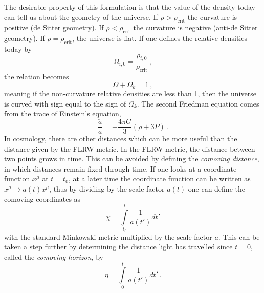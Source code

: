 The desirable property of this formulation is that the value of the density today can tell us about the geometry of the universe. If $\rho>\rho_{\mathrm{crit}}$ the curvature is positive (de Sitter geometry). If $\rho<\rho_{\mathrm{crit}}$ the curvature is negative (anti-de Sitter geometry). If $\rho=\rho_{\mathrm{crit}}$, the universe is flat. If one defines the relative densities today by
\begin{equation}
    \Omega_{i,0} = \frac{\rho_{i,0}}{\rho_\mathrm{crit}}\,,
\end{equation}
the relation becomes
\begin{equation}
    \Omega + \Omega_k = 1 \,,
\end{equation}
meaning if the non-curvature relative densities are less than 1, then the universe is curved with sign equal to the sign of $\Omega_k$. 
The second Friedman equation comes from the trace of Einstein's equation,
\begin{equation}
    \frac{\ddot a}{a} = -\frac{4\pi G}{3}(\rho + 3P)\,.
\end{equation}
In cosmology, there are other distances which can be more useful than the distance given by the FLRW metric. In the FLRW metric, the distance between two points grows in time. 
This can be avoided by defining the \textit{comoving distance}, in which distances remain fixed through time. 
If one looks at a coordinate function $x^\mu$ at $t=t_0$, at a later time the coordinate function can be written as $x^\mu \rightarrow a(t) x^\mu$, thus by dividing by the scale factor $a(t)$  one can define the comoving coordinates as
\begin{equation}
    \chi = \int\limits^{t}_{t_0} \frac{1}{a(t')} dt'
\end{equation}
with the standard Minkowski metric multiplied by the scale factor $a$. This can be taken a step further by determining the distance light has travelled since $t=0$, called the \textit{comoving horizon}, by
\begin{equation}
    \eta = \int\limits^t_0 \frac{1}{a(t')}dt'\,.
\end{equation}

